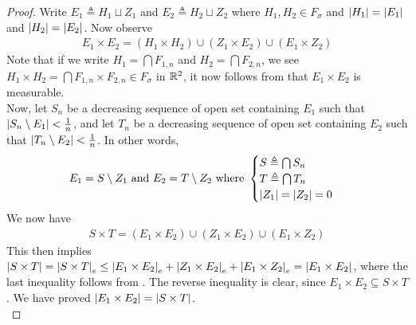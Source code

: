 \documentclass{report}
\begin{document}
\begin{proof}
Write $E_1\triangleq H_1\sqcup Z_1$ and $E_2 \triangleq H_2 \sqcup Z_2$ where $H_1,H_2\in F_\sigma$ and $\left|H_1\right|=\left|E_1\right|$ and $\left|H_2\right|=\left|E_2\right|$. Now observe 
\begin{align*}
E_1 \times E_2 = (H_1 \times H_2)\cup   (Z_1 \times E_2) \cup   (E_1 \times Z_2)
\end{align*}
Note that if we write $H_1=\bigcap F_{1,n}$ and $H_2 = \bigcap F_{2,n}$, we see $H_1 \times H_2 = \bigcap F_{1,n}\times F_{2,n} \in F_{\sigma}$ in $\mathbb{R}^2$, it now follows from  that $E_1 \times E_2$ is measurable.  \\









Now, let $S_n$ be a decreasing sequence of open set containing  $E_1$ such that  $\left|S_n\setminus E_1\right|< \frac{1}{n}$, and let $T_n$ be a decreasing sequence of open set containing $E_2$ such that $\left|T_n \setminus E_2\right|< \frac{1}{n}$. In other words, 
\begin{align*}
E_1 = S \setminus  Z_1 \text{ and }E_2 = T \setminus  Z_2 \text{ where }\begin{cases}
  S\triangleq \bigcap S_n\\
  T\triangleq \bigcap T_n \\
  \left|Z_1\right|=\left|Z_2\right|=0
\end{cases}
\end{align*}
We now have 
\begin{align*}
S \times T= (E_1 \times E_2) \cup (Z_1 \times  E_2)  \cup  (E_1\times Z_2)
\end{align*}
This then implies $\left|S\times T\right|=\left|S\times T\right|_e\leq \left|E_1\times E_2\right|_e+ \left|Z_1 \times E_2\right|_e + \left|E_1 \times Z_2\right|_e= \left|E_1 \times E_2\right|$, where the last inequality follows from . The reverse inequality is clear, since $E_1 \times E_2 \subseteq S \times T$. We have proved $\left|E_1 \times E_2\right|=\left|S \times T\right|$. \\







\end{proof}
\end{document}
